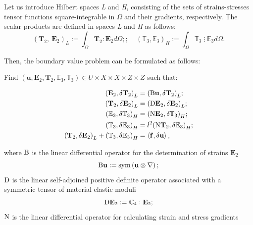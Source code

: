 Let us introduce Hilbert spaces \textit{L} and \textit{H}, consisting of the sets of strains-stresses tensor functions square-integrable in $\Omega $ and their gradients, respectively. The scalar products are defined in spaces \textit{L} and \textit{H} as follows:
\begin{equation} \label{Chirkov_Eq_19_} 
	{\left({{\mathbf T}}_2,{\ {\mathbf E}}_2\right)}_L:=\int_{\Omega }{{{\mathbf T}}_2:{{\mathbf E}}_2d\Omega };;\ \ \ \ \ {\left({{\mathbb T}}_3,{{\mathbb E}}_3\right)}_H:=\int_{\Omega }{{{\mathbb T}}_3\;\vdots\; {{\mathbb E}}_3d\Omega }. 
\end{equation} 

Then, the boundary value problem can be formulated as follows:

Find $({\mathbf u},{{\mathbf E}}_2,{{\mathbf T}}_2,{{\mathbb E}}_3,{{\mathbb T}}_3)\in U{\times }X{\times }X{\times }Z\times Z$ such that:

\begin{equation}\label{Chirkov_Eq_20_} 
	\begin{aligned}
		{\left({{\mathbf E}}_2,\delta {{\mathbf T}}_2\right)}_L&={\left({\rm B}{\mathbf u},\delta {{\mathbf T}}_2\right)}_L;
		\\ 
		{\left({{\mathbf T}}_2,\delta {{\mathbf E}}_2\right)}_L&={\left({\rm D}{{\mathbf E}}_2,\delta {{\mathbf E}}_2\right)}_L; 
		\\ 
		{\left({{\mathbb E}}_3,\delta {{\mathbb T}}_3\right)}_H&={\left({\rm N}{{\mathbf E}}_2,\delta {{\mathbb T}}_3\right)}_H; 
		\\ 
		{\left({{\mathbb T}}_3,\delta {{\mathbb E}}_3\right)}_H&=l^2{\left({{\rm N}{\mathbf T}}_2,{\delta {\mathbb E}}_3\right)}_H;
		\\ 
		{\left({{\mathbf T}}_2,\delta {{\mathbf E}}_2\right)}_L+{\left({{\mathbb T}}_3,\delta {{\mathbb E}}_3\right)}_H&=\left\langle {\mathbf f},\delta {\mathbf u}\right\rangle , 
	\end{aligned}
\end{equation}

\noindent where ${\rm B}$ is the linear differential operator for the determination of strains ${{\mathbf E}}_2$
\begin{equation} \label{Chirkov_Eq_21_} 
	{\rm B}{\mathbf u}:={\rm sym}\left({\mathbf u}\otimes \nabla \right);                                                     
\end{equation} 
${\rm D}$ is the linear self-adjoined positive definite operator associated with a symmetric tensor of material elastic moduli
\begin{equation} \label{Chirkov_Eq_22_} 
	{\rm D}{{\mathbf E}}_2:={{\mathbb C}}_4:{{\mathbf E}}_2;                                                      
\end{equation} 
${\rm N}$ is the linear differential operator for calculating strain and stress gradients

